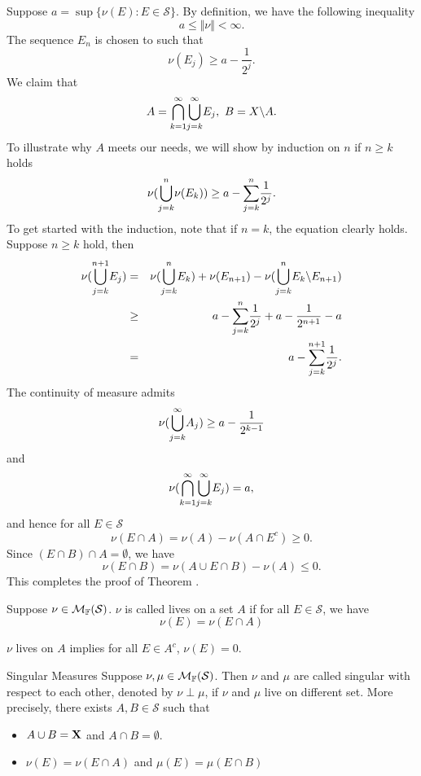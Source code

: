 \begin{Proof}
Suppose $a = \sup\{\nu(E):E\in \mathcal S\}$. By definition, we have the following inequality
$$
a\leq \Vert \nu \Vert < \infty.
$$
The sequence $E_n$ is chosen to such that 
$$
\nu(E_j) \geq a - \frac{1}{2^j}.
$$
We claim that 
$$
A = {\bigcap_{k=1}^{\infty}}{\bigcup_{j=k}^{\infty	}} E_j, \ B = X\backslash A.
$$
To illustrate why $A$ meets our needs, we will show by induction on $n$ if $n\geq k$ holds
$$
\nu({\bigcup_{j=k}^{n}}\nu(E_k)) \geq a - {\sum_{j=k}^{n	}}\frac{1}{2^j}.
$$
To get started with the induction, note that if $n=k$, the equation clearly holds.
Suppose $n \geq k$ hold, then
\begin{eqnarray*}
	\nu({\bigcup_{j=k}^{n+1}}E_j) &=& \nu({\bigcup_{j=k}^{n}}E_k)+\nu(E_{n+1}) - \nu({\bigcup_{j=k}^{n}}E_k \backslash E_{n+1}) \\
	&\geq& a - {\sum_{j=k}^{n}}\frac{1}{2^j}+a - \frac{1}{2^{n+1}}-a \\
	&=& a-{\sum_{j=k}^{n+1}}\frac{1}{2^j}.
\end{eqnarray*}
The continuity of measure admits 
$$
\nu({\bigcup_{j=k}^{\infty}}A_j) \geq a-\frac{1}{2^{k-1}}
$$
and 
$$
\nu({\bigcap_{k=1}^{\infty}}{\bigcup_{j=k}^{\infty	}} E_j)=a,
$$
and hence for all $E\in \mathcal S$ 
$$
\nu(E \cap A) = \nu(A) - \nu(A\cap E^c) \geq 0.
$$
Since $(E\cap B)\cap A =\emptyset$, we have
$$
\nu(E \cap B) = \nu(A\cup E \cap B)-\nu(A) \leq 0.
$$
This completes the proof of Theorem .
\end{Proof}

\begin{sdefinition}{}{}
Suppose $\nu \in \mathcal{M}_{\mathbb{F}}(\mathcal S)$. $\nu$ is called lives on a set $A$ if for all $E\in \mathcal S$, we have
$$
\nu(E) = \nu(E\cap A)
$$ 	
\end{sdefinition}
\begin{sremark}{}{}
$\nu$ lives on $A$ implies for all $E \in A^c$, $\nu(E)=0$.	
\end{sremark}


\begin{sdefinition}{Singular Measures}{}
Suppose $\nu,\mu \in \mathcal{M}_{\mathbb{F}}(\mathcal S)$. Then $\nu$ and $\mu$ are called singular with    respect to each other, denoted by $\nu \perp \mu$, if $\nu$ and $\mu$ live on different set. More precisely, there exists $A,B\in \mathcal S$ such that   
\begin{itemize}
	\item $A\cup B=\mathbf{X}$ and $A\cap B= \emptyset$.
	\item $\nu(E)=\nu(E\cap A)$ and $\mu(E)=\mu(E\cap B)$
\end{itemize}
\end{sdefinition}


